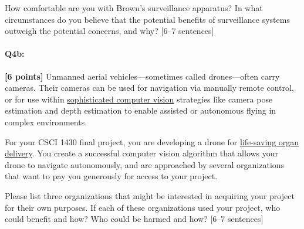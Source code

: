 \begin{tcolorbox}[colback=orange!5!white,colframe=orange!75!black]
How comfortable are you with Brown's surveillance apparatus?
In what circumstances do you believe that the potential benefits of surveillance systems outweigh the potential concerns, and why? [6--7 sentences]
\end{tcolorbox}


\pagebreak
\paragraph{Q4b:} \textbf{[6 points]} Unmanned aerial vehicles---sometimes called drones---often carry cameras. Their cameras can be used for navigation via manually remote control, or for use within \href{https://link.springer.com/article/10.1007/s10846-017-0483-z}{sophisticated computer vision} strategies like camera pose estimation and depth estimation to enable assisted or autonomous flying in complex environments.

For your CSCI 1430 final project, you are developing a drone for \href{https://www.cnn.com/2019/05/01/health/drone-organ-transplant-bn-trnd/index.html}{life-saving organ delivery}. You create a successful computer vision algorithm that allows your drone to navigate autonomously, and are approached by several organizations that want to pay you generously for access to your project.

\begin{tcolorbox}[colback=orange!5!white,colframe=orange!75!black]
Please list three organizations that might be interested in acquiring your project for their own purposes. If each of these organizations used your project, who could benefit and how? Who could be harmed and how? [6--7 sentences]
\end{tcolorbox}


